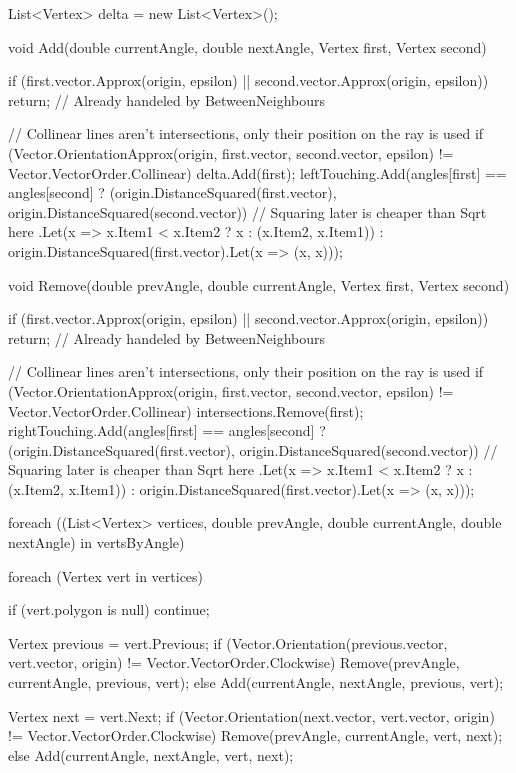 \documentclass[12pt]{article}
\begin{document}
\begin{Csharp}[caption=class Map]
{    List<Vertex> delta = new List<Vertex>();

    void Add(double currentAngle, double nextAngle, Vertex first, Vertex second)
    {
        if (first.vector.Approx(origin, epsilon) || second.vector.Approx(origin, epsilon)) return; // Already handeled by BetweenNeighbours

        // Collinear lines aren't intersections, only their position on the ray is used
        if (Vector.OrientationApprox(origin, first.vector, second.vector, epsilon) != Vector.VectorOrder.Collinear) delta.Add(first);
        leftTouching.Add(angles[first] == angles[second]
                ? (origin.DistanceSquared(first.vector), origin.DistanceSquared(second.vector)) // Squaring later is cheaper than Sqrt here
                    .Let(x => x.Item1 < x.Item2 ? x : (x.Item2, x.Item1))
                : origin.DistanceSquared(first.vector).Let(x => (x, x)));
    }
    void Remove(double prevAngle, double currentAngle, Vertex first, Vertex second)
    {
        if (first.vector.Approx(origin, epsilon) || second.vector.Approx(origin, epsilon)) return; // Already handeled by BetweenNeighbours

        // Collinear lines aren't intersections, only their position on the ray is used
        if (Vector.OrientationApprox(origin, first.vector, second.vector, epsilon) != Vector.VectorOrder.Collinear) intersections.Remove(first);
        rightTouching.Add(angles[first] == angles[second]
                ? (origin.DistanceSquared(first.vector), origin.DistanceSquared(second.vector)) // Squaring later is cheaper than Sqrt here
                    .Let(x => x.Item1 < x.Item2 ? x : (x.Item2, x.Item1))
                : origin.DistanceSquared(first.vector).Let(x => (x, x)));
    }

    foreach ((List<Vertex> vertices, double prevAngle, double currentAngle, double nextAngle) in vertsByAngle)
    {
        foreach (Vertex vert in vertices)
        {
            if (vert.polygon is null) continue;

            Vertex previous = vert.Previous;
            if (Vector.Orientation(previous.vector, vert.vector, origin) != Vector.VectorOrder.Clockwise) Remove(prevAngle, currentAngle, previous, vert);
            else Add(currentAngle, nextAngle, previous, vert);

            Vertex next = vert.Next;
            if (Vector.Orientation(next.vector, vert.vector, origin) != Vector.VectorOrder.Clockwise) Remove(prevAngle, currentAngle, vert, next);
            else Add(currentAngle, nextAngle, vert, next);
        }

}}
\end{Csharp}
\end{document}
